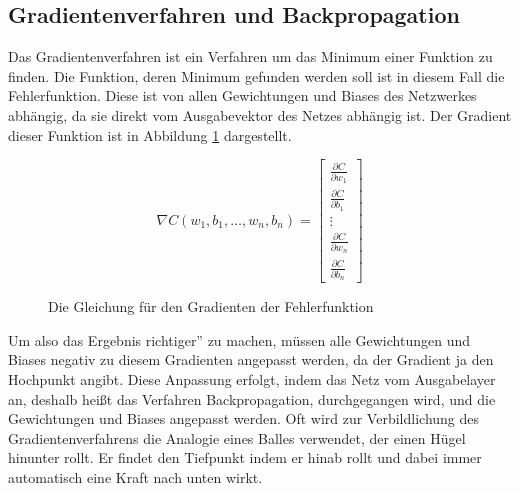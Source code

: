 \documentclass{article}
\begin{document}
\subsection{Gradientenverfahren und Backpropagation}
Das Gradientenverfahren ist ein Verfahren um das Minimum einer Funktion zu finden. Die Funktion, deren Minimum gefunden werden soll ist in diesem Fall die Fehlerfunktion. Diese ist von allen Gewichtungen und Biases des Netzwerkes abhängig, da sie direkt vom Ausgabevektor des Netzes abhängig ist. Der Gradient dieser Funktion ist in Abbildung \ref{Gradient_Function} dargestellt.
\begin{figure}[h]
	\begin{equation*}
	\nabla C(w_1,b_1,\ldots,w_n,b_n)=
	\begin{bmatrix}
		\frac{\partial C}{\partial w_1}\\
		\frac{\partial C}{\partial b_1}\\
		\vdots\\
		\frac{\partial C}{\partial w_n}\\
		\frac{\partial C}{\partial b_n}
	\end{bmatrix}
	\end{equation*}
	\caption{Die Gleichung für den Gradienten der Fehlerfunktion}
	\label{Gradient_Function}
\end{figure}
\newline
Um also das Ergebnis \glqq richtiger'' zu machen, müssen alle Gewichtungen und Biases negativ zu diesem Gradienten angepasst werden, da der Gradient ja den Hochpunkt angibt. Diese Anpassung erfolgt, indem das Netz vom Ausgabelayer an, deshalb heißt das Verfahren Backpropagation, durchgegangen wird, und die Gewichtungen und Biases angepasst werden.\newline
Oft wird zur Verbildlichung des Gradientenverfahrens die Analogie eines Balles verwendet, der einen Hügel hinunter rollt. Er findet den Tiefpunkt indem er hinab rollt und dabei immer automatisch eine Kraft nach unten wirkt.
\end{document}
